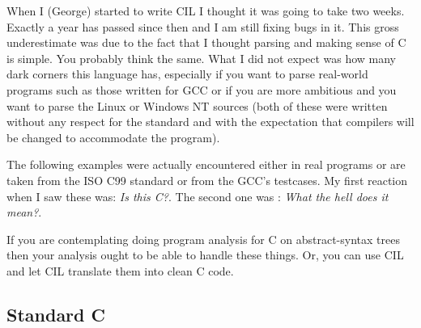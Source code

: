 \documentclass{article}
\begin{document}
 When I (George) started to write CIL I thought it was going to take two weeks.
Exactly a year has passed since then and I am still fixing bugs in it. This
gross underestimate was due to the fact that I thought parsing and making
sense of C is simple. You probably think the same. What I did not expect was
how many dark corners this language has, especially if you want to parse
real-world programs such as those written for GCC or if you are more ambitious
and you want to parse the Linux or Windows NT sources (both of these were
written without any respect for the standard and with the expectation that
compilers will be changed to accommodate the program). 

 The following examples were actually encountered either in real programs or
are taken from the ISO C99 standard or from the GCC's testcases. My first
reaction when I saw these was: {\em Is this C?}. The second one was : {\em
What the hell does it mean?}. 

 If you are contemplating doing program analysis for C on abstract-syntax
trees then your analysis ought to be able to handle these things. Or, you can
use CIL and let CIL translate them into clean C code. 

%
%
%
 \subsection{Standard C}
\end{document}
